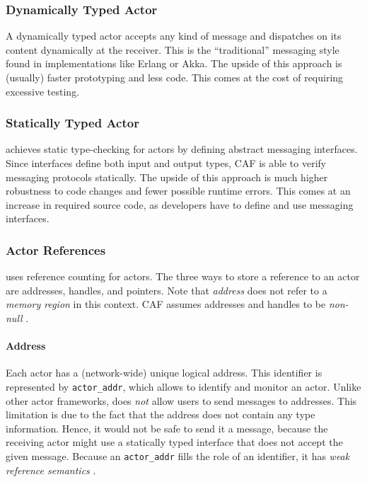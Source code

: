 \subsubsection{Dynamically Typed Actor}

A dynamically typed actor accepts any kind of message and dispatches on its content dynamically at the receiver.
This is the ``traditional'' messaging style found in implementations like Erlang or Akka.
The upside of this approach is (usually) faster prototyping and less code.
This comes at the cost of requiring excessive testing.

\subsubsection{Statically Typed Actor}

\lib achieves static type-checking for actors by defining abstract messaging interfaces.
Since interfaces define both input and output types, CAF is able to verify messaging protocols statically.
The upside of this approach is much higher robustness to code changes and fewer possible runtime errors.
This comes at an increase in required source code, as developers have to define and use messaging interfaces.

\subsubsection{Actor References}
\label{actor-reference}

\lib uses reference counting for actors. The three ways to store a reference to an actor are addresses, handles, and pointers. Note that \emph{address} does not refer to a \emph{memory region} in this context. CAF assumes addresses and handles to be \emph{non-null} .

\paragraph{Address}
\label{actor-address}

Each actor has a (network-wide) unique logical address. This identifier is represented by \lstinline^actor_addr^, which allows to identify and monitor an actor.
Unlike other actor frameworks, \lib does \emph{not} allow users to send messages to addresses.
This limitation is due to the fact that the address does not contain any type information.
Hence, it would not be safe to send it a message, because the receiving actor might use a statically typed interface that does not accept the given message. Because an \lstinline^actor_addr^ fills the role of an identifier, it has \emph{weak reference semantics} .

